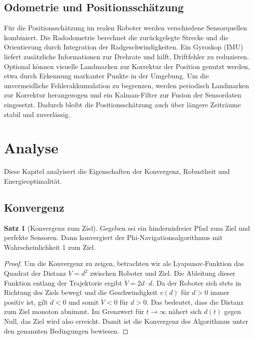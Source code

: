 ﻿\documentclass[a4paper,12pt]{article}
\theoremstyle{definition}
\newtheorem{satz}{Satz}
\begin{document}
\subsection{Odometrie und Positionsschätzung}

Für die Positionsschätzung im realen Roboter werden verschiedene Sensorquellen kombiniert. Die Radodometrie berechnet die zurückgelegte Strecke und die Orientierung durch Integration der Radgeschwindigkeiten. Ein Gyroskop (IMU) liefert zusätzliche Informationen zur Drehrate und hilft, Driftfehler zu reduzieren. Optional können visuelle Landmarken zur Korrektur der Position genutzt werden, etwa durch Erkennung markanter Punkte in der Umgebung. Um die unvermeidliche Fehlerakkumulation zu begrenzen, werden periodisch Landmarken zur Korrektur herangezogen und ein Kalman-Filter zur Fusion der Sensordaten eingesetzt. Dadurch bleibt die Positionsschätzung auch über längere Zeiträume stabil und zuverlässig.

\section{Analyse}
Diese Kapitel analyisert die Eigenschaften der Konvergenz, Robustheit und Energieoptimalität.

\subsection{Konvergenz}

\begin{satz}[Konvergenz zum Ziel]
Gegeben sei ein hindernisfreier Pfad zum Ziel und perfekte Sensoren. Dann konvergiert der Phi-Navigationsalgorithmus mit Wahrscheinlichkeit 1 zum Ziel. 
\end{satz}

\begin{proof} Um die Konvergenz zu zeigen, betrachten wir als Lyapunov-Funktion das Quadrat der Distanz $V = d^2$ zwischen Roboter und Ziel. Die Ableitung dieser Funktion entlang der Trajektorie ergibt $\dot{V} = 2d \cdot \dot{d}$. Da der Roboter sich stets in Richtung des Ziels bewegt und die Geschwindigkeit $v(d)$ für $d > 0$ immer positiv ist, gilt $\dot{d} < 0$ und somit $\dot{V} < 0$ für $d > 0$. Das bedeutet, dass die Distanz zum Ziel monoton abnimmt. Im Grenzwert für $t \to \infty$ nähert sich $d(t)$ gegen Null, das Ziel wird also erreicht. Damit ist die Konvergenz des Algorithmus unter den genannten Bedingungen bewiesen.
\end{proof}
\end{document}
